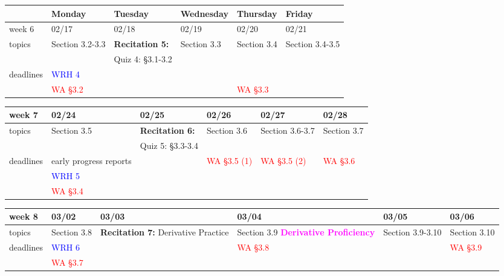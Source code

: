 \documentclass[11pt]{article}
\begin{document}
\newpage

\begin{center}
\begin{tabularx}{\textwidth}{|p{1.5cm}|| L | L | L | L | L |}
\hline
&Monday & Tuesday & Wednesday & Thursday & Friday \\
\hline \hline
week 6&02/17&02/18&02/19&02/20&02/21\\ \hline
topics&Section 3.2-3.3&\textbf{Recitation 5:}&Section 3.3&Section 3.4&Section 3.4-3.5\\ 
&&{Quiz 4}: \S 3.1-3.2&&&\\ \hline
deadlines&\textcolor{blue}{WRH 4}& &&& \\ 
&\textcolor{red}{WA \S 3.2}&&&\textcolor{red}{WA \S 3.3}&\\ \hline \end{tabularx}
\end{center}

\begin{center}
\begin{tabularx}{\textwidth}{|p{1.5cm}|| L | L | L | L | L |}
\hline
week 7&02/24&02/25&02/26&02/27&02/28\\ \hline
topics&Section 3.5&\textbf{Recitation 6:}&Section 3.6&Section 3.6-3.7&Section 3.7\\ 
&&{Quiz 5}: \S 3.3-3.4&&&\\ \hline
deadlines&\textcolor{ddgreen}{early progress reports}& &\textcolor{red}{WA \S 3.5 (1)}&\textcolor{red}{WA \S 3.5 (2)}&\textcolor{red}{WA \S 3.6} \\
&\textcolor{blue}{WRH 5}&&&&\\
&\textcolor{red}{WA \S 3.4}&&&& \\ \hline
\end{tabularx} \end{center}

\begin{center}
\begin{tabularx}{\textwidth}{|p{1.5cm}|| L | L | L | L | L |}
\hline
week 8&03/02&03/03&03/04&03/05&03/06\\ \hline
topics&Section 3.8&\textbf{Recitation 7:} Derivative Practice&Section 3.9 \textcolor{magenta}{\textbf{Derivative Proficiency}}&Section 3.9-3.10&Section 3.10\\ 
 \hline
deadlines&\textcolor{blue}{WRH 6} &&\textcolor{red}{WA \S 3.8}&&\textcolor{red}{WA \S 3.9} \\
&\textcolor{red}{WA \S 3.7}&&&&\\ \hline \end{tabularx} \end{center}
\end{document}
